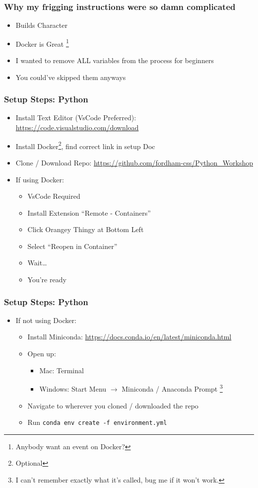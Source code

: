 \documentclass{beamer}
\begin{document}
\begin{frame}
  \frametitle{Why my frigging instructions were so damn complicated}
  \begin{itemize}
    \item Builds Character
    \pause
    \item Docker is Great
    \footnote{Anybody want an event on Docker?}
    \pause
    \item I wanted to remove ALL variables from the process for beginners
    \pause
    \item You could've skipped them anyways
  \end{itemize}
\end{frame}
\begin{frame}
  \frametitle{Setup Steps: Python}
  \begin{itemize}
    \item Install Text Editor (VsCode Preferred): \url{https://code.visualstudio.com/download}
    \item Install Docker\footnote{Optional}, find correct link in setup Doc
    \item Clone / Download Repo: \url{https://github.com/fordham-css/Python_Workshop}
    \pause
    \item If using Docker:
      \begin{itemize}
        \item VsCode Required
        \item Install Extension ``Remote - Containers''
        \item Click Orangey Thingy at Bottom Left
        \item Select ``Reopen in Container''
        \item Wait\dots
        \item You're ready
      \end{itemize}
  \end{itemize}
\end{frame}
\begin{frame}
  \frametitle{Setup Steps: Python}

  \begin{itemize}
    \item If not using Docker:
      \begin{itemize}
        \item Install Miniconda: \url{https://docs.conda.io/en/latest/miniconda.html}
        \item Open up:
          \begin{itemize}
            \item Mac: Terminal
            \item Windows: Start Menu $\rightarrow$ Miniconda / Anaconda Prompt
            \footnote{I can't remember exactly what it's called, bug me if it won't work.}
          \end{itemize}
        \pause
        \item Navigate to wherever you cloned / downloaded the repo
        \item Run \texttt{conda env create -f environment.yml}
      \end{itemize}
  \end{itemize}
\end{frame}
\end{document}
